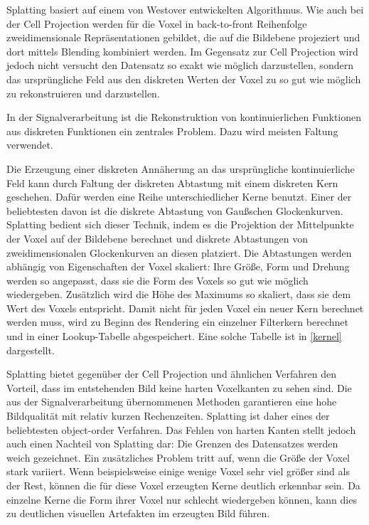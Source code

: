\documentclass[a4paper,fontsize=12pt,toc=bib,halfparskip,ngerman]{scrartcl}
\begin{document}
Splatting basiert auf einem von Westover entwickelten Algorithmus\cite{westover1989interactive}\cite{westover1990footprint}. Wie auch bei der Cell Projection werden f\"ur die Voxel in back-to-front Reihenfolge zweidimensionale Repr\"asentationen gebildet, die auf die Bildebene projeziert und dort mittels Blending kombiniert werden. Im Gegensatz zur Cell Projection wird jedoch nicht versucht den Datensatz so exakt wie m\"oglich darzustellen, sondern das urspr\"ungliche Feld aus den diskreten Werten der Voxel zu so gut wie m\"oglich zu rekonstruieren und darzustellen. 

In der Signalverarbeitung ist die Rekonstruktion von kontinuierlichen Funktionen aus diskreten Funktionen ein zentrales Problem. Dazu wird meisten Faltung verwendet. 

Die Erzeugung einer diskreten Ann\"aherung an das urspr\"ungliche kontinuierliche Feld kann durch Faltung der diskreten Abtastung mit einem diskreten Kern geschehen. Daf\"ur werden eine Reihe unterschiedlicher Kerne benutzt. Einer der beliebtesten davon ist die diskrete Abtastung von Gau{\ss}schen Glockenkurven. Splatting bedient sich dieser Technik, indem es die Projektion der Mittelpunkte der Voxel auf der Bildebene berechnet und diskrete Abtastungen von zweidimensionalen Glockenkurven an diesen platziert. Die Abtastungen werden abh\"angig von Eigenschaften der Voxel skaliert: Ihre Gr\"o{\ss}e, Form und Drehung werden so angepasst, dass sie die Form des Voxels so gut wie m\"oglich wiedergeben. Zus\"atzlich wird die H\"ohe des Maximums so skaliert, dass sie dem Wert des Voxels entspricht. Damit nicht f\"ur jeden Voxel ein neuer Kern berechnet werden muss, wird zu Beginn des Rendering ein einzelner Filterkern berechnet und in einer Lookup-Tabelle abgespeichert. Eine solche Tabelle ist in \cref{kernel} dargestellt.

Splatting bietet gegen\"uber der Cell Projection und \"ahnlichen Verfahren den Vorteil, dass im entstehenden Bild keine harten Voxelkanten zu sehen sind. Die aus der Signalverarbeitung \"ubernommenen Methoden garantieren eine hohe Bildqualit\"at mit relativ kurzen Rechenzeiten. Splatting ist daher eines der beliebtesten object-order Verfahren.
Das Fehlen von harten Kanten stellt jedoch auch einen Nachteil von Splatting dar: Die Grenzen des Datensatzes werden weich gezeichnet. Ein zus\"atzliches Problem tritt auf, wenn die Gr\"o{\ss}e der Voxel stark variiert. Wenn beispielsweise einige wenige Voxel sehr viel gr\"o{\ss}er sind als der Rest, k\"onnen die f\"ur diese Voxel erzeugten Kerne deutlich erkennbar sein. Da einzelne Kerne die Form ihrer Voxel nur schlecht wiedergeben k\"onnen, kann dies zu deutlichen visuellen Artefakten im erzeugten Bild f\"uhren.
\end{document}

